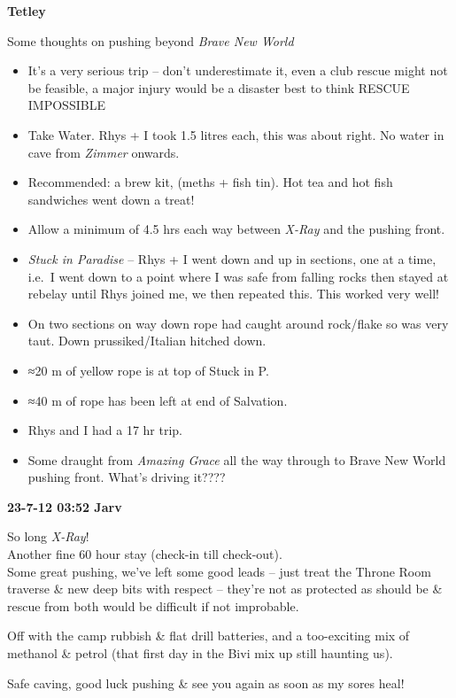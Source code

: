 \textbf{Tetley}

Some thoughts on pushing beyond \emph{Brave New World}

\begin{itemize}
\tightlist
\item
  It's a very serious trip -- don't underestimate it, even a club rescue
  might not be feasible, a major injury would be a disaster best to
  think RESCUE IMPOSSIBLE
\item
  Take Water. Rhys + I took 1.5 litres each, this was about right. No
  water in cave from \emph{Zimmer} onwards.
\item
  Recommended: a brew kit, (meths + fish tin). Hot tea and hot fish
  sandwiches went down a treat!
\item
  Allow a minimum of 4.5 hrs each way between \emph{X-Ray} and the
  pushing front.
\item
  \emph{Stuck in Paradise} -- Rhys + I went down and up in sections, one
  at a time, i.e.~I went down to a point where I was safe from falling
  rocks then stayed at rebelay until Rhys joined me, we then repeated
  this. This worked very well!
\item
  On two sections on way down rope had caught around rock/flake so was
  very taut. Down prussiked/Italian hitched down.
\item
  ≈20 m of yellow rope is at top of Stuck in P.
\item
  ≈40 m of rope has been left at end of Salvation.
\item
  Rhys and I had a 17 hr trip.
\item
  Some draught from \emph{Amazing Grace} all the way through to Brave
  New World pushing front. What's driving it????
\end{itemize}

\textbf{23-7-12 03:52 Jarv}

So long \emph{X-Ray}!\\
Another fine 60 hour stay (check-in till check-out).\\
Some great pushing, we've left some good leads -- just treat the Throne
Room traverse \& new deep bits with respect -- they're not as protected
as should be \& rescue from both would be difficult if not improbable.

Off with the camp rubbish \& flat drill batteries, and a too-exciting
mix of methanol \& petrol (that first day in the Bivi mix up still
haunting us).

Safe caving, good luck pushing \& see you again as soon as my sores
heal!

